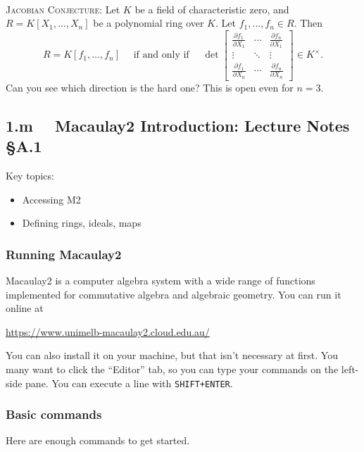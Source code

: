 \documentclass[12pt]{amsart}
\newcommand{\0}{$\phantom{.}$}
\newcommand{\1}{\mathbbm{1}}
\begin{document}
\

\noindent \textsc{Jacobian Conjecture:} Let $K$ be a field of characteristic zero, and $R=K[X_1,\dots,X_n]$ be a polynomial ring over $K$. Let $f_1,\dots,f_n\in R$. Then 
\vspace{-5mm}
\[ R=K[f_1,\dots,f_n] \quad \text{ if and only if } \quad \det \begin{bmatrix} \frac{\partial f_1}{\partial X_1} & \cdots & \frac{\partial f_n}{\partial X_1} \\
\vdots & \ddots & \vdots \\
 \frac{\partial f_1}{\partial X_n} & \cdots & \frac{\partial f_n}{\partial X_n} \end{bmatrix} \in K^\times.\]
Can you see which direction is the hard one? This is open even for $n=3$.

\newpage



\subsection*{1.m \, \, Macaulay2 Introduction:  Lecture Notes \S A.1}

\begin{framed} Key topics:
\begin{itemize}
\item Accessing M2
\item Defining rings, ideals, maps
\end{itemize}
\end{framed}

\subsubsection*{Running Macaulay2} Macaulay2 is a computer algebra system with a wide range of functions implemented for commutative algebra and algebraic geometry. You can run it online at

\begin{center} \url{https://www.unimelb-macaulay2.cloud.edu.au/} \end{center}

\noindent You can also install it on your machine, but that isn't necessary at first. You many want to click the ``Editor'' tab, so you can type your commands on the left-side pane. You can execute a line with \texttt{SHIFT+ENTER}.


\subsubsection*{Basic commands} Here are enough commands to get started.
\end{document}
